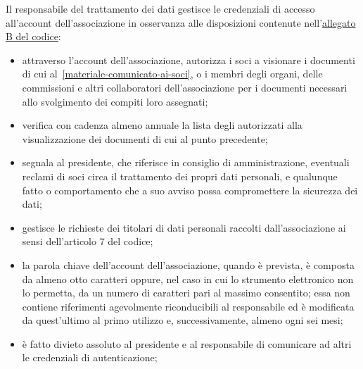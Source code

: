 Il responsabile del trattamento dei dati gestisce le credenziali di accesso
all'account dell'associazione in osservanza alle disposizioni
contenute
nell'\href{http://www.garanteprivacy.it/web/guest/home/docweb/-/docweb-display/docweb/1557184}{allegato
B del codice}:
\begin{itemize}
    \item attraverso l'account dell'associazione, autorizza i soci a
        visionare i documenti di cui al~\ref{materiale-comunicato-ai-soci},
        o i membri degli organi, delle commissioni e altri collaboratori
        dell'associazione per i documenti necessari allo svolgimento dei
        compiti loro assegnati;
    \item verifica con cadenza almeno annuale la lista degli 
        autorizzati alla visualizzazione dei documenti di cui al punto
        precedente;
    \item segnala al presidente, che riferisce in consiglio di
        amministrazione, eventuali reclami di soci circa il
        trattamento dei propri dati personali, e qualunque fatto o
        comportamento che a suo avviso possa compromettere la sicurezza dei
        dati;
    \item gestisce le richieste dei titolari di dati personali raccolti
        dall'associazione ai sensi dell'articolo 7 del codice;
    \item la parola chiave dell'account dell'associazione, quando è prevista,
        è composta da almeno otto caratteri oppure, nel caso in cui lo
        strumento elettronico non lo permetta, da un numero di caratteri
        pari al massimo consentito; essa non contiene riferimenti
        agevolmente riconducibili al responsabile ed è modificata da
        quest'ultimo al primo utilizzo e, successivamente, almeno ogni sei
        mesi;
    \item è fatto divieto assoluto al presidente e al responsabile di
        comunicare ad altri le credenziali di autenticazione;
\end{itemize}
